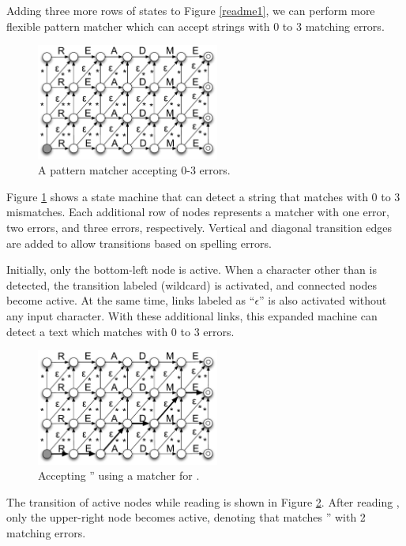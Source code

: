 \documentclass{sigchi}
\begin{document}
Adding three more rows of states to Figure \ref{readme1}, we can perform more
flexible pattern matcher which can accept strings with
0 to 3 matching errors.

\begin{figure}[htb]
  \centerline{\includegraphics[width=60mm,bb=0 0 443 282]{figures/readme-ambig.pdf}}
  \caption{A pattern matcher accepting 0-3 errors.}
  \label{shifterambig}
\end{figure}

Figure \ref{shifterambig} shows a state machine that can detect a string
that matches  with 0 to 3 mismatches.
Each additional row of nodes represents a matcher with one error,
two errors, and three errors, respectively.
Vertical and diagonal transition edges are added to allow
transitions based on spelling errors.

Initially, only the bottom-left node is active.
When a character other than  is detected, 
the transition labeled \sqsf{*} (wildcard) is activated,
and connected nodes become active.
At the same time, links labeled as ``$\epsilon$''
is also activated without any input character.
With these additional links, this expanded machine can detect a text which
matches  with 0 to 3 errors.

\begin{figure}[htb]
  \centerline{\includegraphics[width=60mm,bb=0 0 443 282]{figures/readme-reedee.pdf}}
  \caption{Accepting '' using a matcher for .}
  \label{readme-reedee}
\end{figure}

The transition of active nodes while reading
 is shown in Figure \ref{readme-reedee}.
After reading ,
only the upper-right node becomes active,
denoting that  matches
'' with 2 matching errors.
\end{document}
